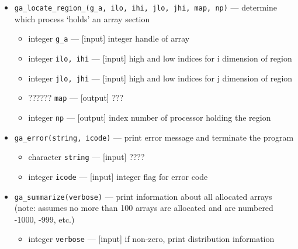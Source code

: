 \begin{itemize}
\item {\tt ga\_locate\_region\_(g\_a, ilo, ihi, jlo, jhi, map, np)} --- 
determine which process `holds' an
  array section
\begin{itemize}
\item     integer {\tt g\_a}         --- [input] integer handle of array
\item     integer {\tt ilo, ihi}    --- [input] high and low indices for i dimension of region
\item     integer {\tt jlo, jhi}    --- [input] high and low indices for j dimension of region
\item     ??????  {\tt map}                 --- [output] ???
\item     integer {\tt np}          --- [output] index number of processor holding the region 
\end{itemize}

\item {\tt ga\_error(string, icode)} --- print error message and terminate the
  program
\begin{itemize}
\item      character {\tt string}     --- [input] ????
\item      integer {\tt icode}        --- [input] integer flag for error code
\end{itemize}

\item {\tt ga\_summarize(verbose)} --- print information about all
  allocated arrays (note: assumes no more than 100 arrays are allocated and
are numbered -1000, -999, etc.)
\begin{itemize}
\item      integer {\tt verbose}      --- [input] if non-zero, print distribution information
\end{itemize}

\end{itemize}

